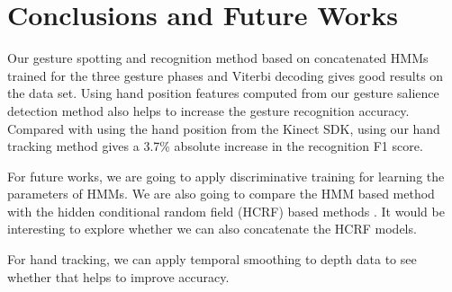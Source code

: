 \documentclass{sig-alternate-2013}
\begin{document}
\vfill

\section{Conclusions and Future Works}
Our gesture spotting and recognition method based on concatenated HMMs trained
for the three gesture phases and Viterbi decoding gives good results on the
data set. Using hand position features computed from our gesture salience
detection method also helps to increase the gesture recognition accuracy.
Compared with using the hand position from the Kinect SDK, using our hand
tracking method gives a 3.7\% absolute increase in the recognition F1 score.

For future works, we are going to apply discriminative training for learning the
parameters of HMMs. We are also going to compare the HMM based method with the
hidden conditional random field (HCRF) based methods \cite{morency07, wang06}.
It would be interesting to explore whether we can also concatenate the HCRF
models.

For hand tracking, we can apply temporal smoothing to depth data to
see whether that helps to improve accuracy.
 
\vfill


%
\vfill\eject
\end{document}
